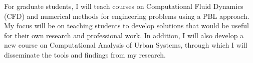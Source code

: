 \documentclass[12pt]{article}
\begin{document}
For graduate students, I will teach courses on Computational Fluid Dynamics (CFD) and numerical methods for engineering problems using a PBL approach. My focus will be on teaching students to develop solutions that would be useful for their own research and professional work. In addition, I will also develop a new course on Computational Analysis of Urban Systems, through which I will disseminate the tools and findings from my research.

 

\end{document}
